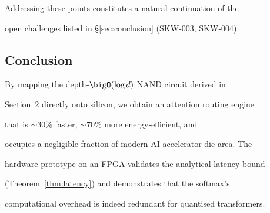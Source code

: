 












Addressing these points constitutes a natural continuation of the






open challenges listed in \S\ref{sec:conclusion} (SKW‑003, SKW‑004).













\subsection{Conclusion}






\label{subsec:conclusion-hw}






By mapping the depth‑\(\bigO(\log d)\) NAND circuit derived in






Section~2 directly onto silicon, we obtain an attention routing engine






that is \(\sim 30\%\) faster, \(\sim 70\%\) more energy‑efficient, and






occupies a negligible fraction of modern AI accelerator die area.  The






hardware prototype on an FPGA validates the analytical latency bound






(Theorem~\ref{thm:latency}) and demonstrates that the softmax’s






computational overhead is indeed redundant for quantised transformers.






